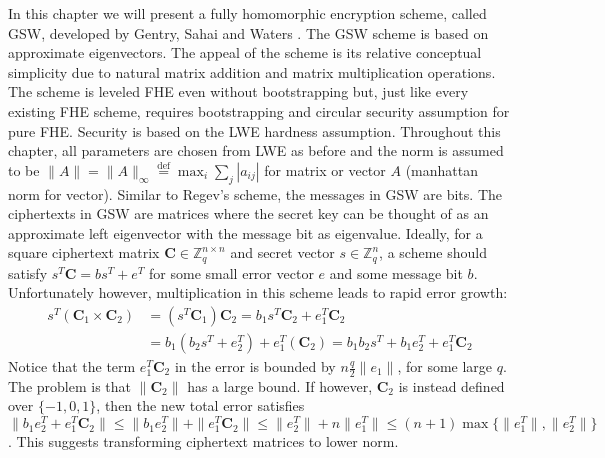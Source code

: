 In this chapter we will present a fully homomorphic encryption scheme, called GSW, developed by Gentry, Sahai and Waters \cite{GSW13}. The GSW scheme is based on approximate eigenvectors. The appeal of the scheme is its relative conceptual simplicity due to natural matrix addition and matrix multiplication operations. The scheme is leveled FHE even without bootstrapping but, just like every existing FHE scheme, requires bootstrapping and circular security assumption for pure FHE. Security is based on the LWE hardness assumption. Throughout this chapter, all parameters are chosen from LWE as before and the norm is assumed to be $\|A\| = \|A\|_{\infty} \stackrel{\mathrm{def}}{=} \max_{i} \sum_{j} |a_{i j}|$ for matrix or vector $A$ (manhattan norm for vector). Similar to Regev's scheme, the messages in GSW are bits. The ciphertexts in GSW are matrices where the secret key can be thought of as an approximate left eigenvector with the message bit as eigenvalue. Ideally, for a square ciphertext matrix $\textbf{C} \in \mathbb{Z}_q^{n \times n}$ and secret vector $s \in \mathbb{Z}_q^n$, a scheme should satisfy $s^T\textbf{C} = bs^T + e^T$ for some small error vector $e$ and some message bit $b$. Unfortunately however, multiplication in this scheme leads to rapid error growth:
\begin{equation*}
    \begin{aligned}
    s^T(\textbf{C}_1 \times \textbf{C}_2) &= (s^T\textbf{C}_1)\textbf{C}_2 = b_1s^T\textbf{C}_2 + e_1^T\textbf{C}_2 \\
    &= b_1(b_2s^T + e_2^T) + e_1^T(\textbf{C}_2) = b_1b_2s^T + b_1e_2^T + e_1^T\textbf{C}_2
    \end{aligned}
\end{equation*}
Notice that the term $e_1^T\textbf{C}_2$ in the error is bounded by $n\frac{q}{2}\|e_1\|$, for some large $q$. The problem is that $\| \textbf{C}_2 \|$ has a large bound. If however, $\textbf{C}_2$ is instead defined over $\{-1,0,1\}$, then the new total error satisfies $\| b_1e_2^T + e_1^T\textbf{C}_2 \| \leq \| b_1e_2^T \| + \|e_1^T\textbf{C}_2\| \leq \|e_2^T\| + n\|e_1^T\| \leq (n+1) \max\{ \| e_1^T \| ,\|e_2^T\|\}$. This suggests transforming ciphertext matrices to lower norm. 

